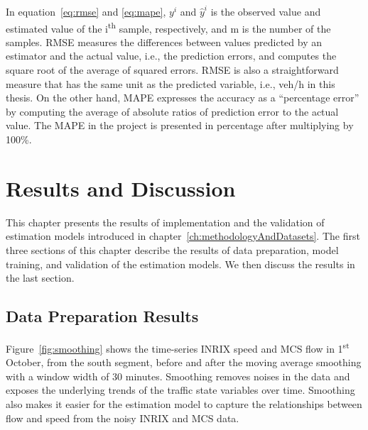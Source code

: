 \documentclass[english]{kththesis}
\begin{document}
In equation~\ref{eq:rmse} and \ref{eq:mape}, $y^i$ and $\hat{y}^i$ is the observed value and estimated value of the i\textsuperscript{th} sample, respectively, and m is the number of the samples. RMSE measures the differences between values predicted by an estimator and the actual value, i.e., the prediction errors, and computes the square root of the average of squared errors. RMSE is also a straightforward measure that has the same unit as the predicted variable, i.e., veh/h in this thesis. On the other hand, MAPE expresses the accuracy as a “percentage error” by computing the average of absolute ratios of prediction error to the actual value. The MAPE in the project is presented in percentage after multiplying by 100\%.

\chapter{Results and Discussion}
\label{ch:resultsAndDiscussions}
This chapter presents the results of implementation and the validation of estimation models introduced in chapter~\ref{ch:methodologyAndDatasets}. The first three sections of this chapter describe the results of data preparation, model training, and validation of the estimation models. We then discuss the results in the last section.

\section{Data Preparation Results}
\label{sec:resultsDataPreparation}
Figure~\ref{fig:smoothing} shows the time-series INRIX speed and MCS flow in 1\textsuperscript{st} October, from the south segment, before and after the moving average smoothing with a window width of 30 minutes. Smoothing removes noises in the data and exposes the underlying trends of the traffic state variables over time. Smoothing also makes it easier for the estimation model to capture the relationships between flow and speed from the noisy INRIX and MCS data.
\end{document}
